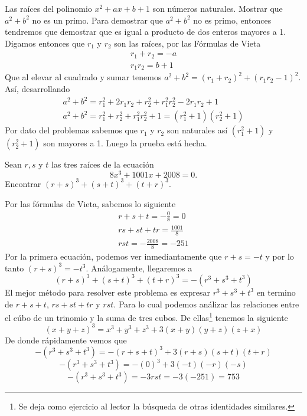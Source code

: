 {    \begin{example}[1986 URSS]
        Las raíces del polinomio $x^2 + ax + b + 1$ son números naturales. Mostrar que $a^2 + b^2$ no es un primo.
        \solution
        {
            Para demostrar que $a^2 + b^2$ no es primo, entonces tendremos que demostrar que es igual a producto de dos enteros mayores a 1.
            Digamos entonces que $r_1$ y $r_2$ son las raíces, por las Fórmulas de Vieta
            \begin{gather*}
                r_1 + r_2 = -a\\
                r_1 r_2 = b + 1
            \end{gather*}
            Que al elevar al cuadrado y sumar tenemos $a^2 + b^2 = (r_1 + r_2)^2 + (r_1 r_2 - 1)^2$. Así, desarrollando
            \begin{gather*}
                a^2 + b^2 = r^2_1 + 2r_1 r_2 + r^2_2 + r^2_1 r^2_2 - 2r_1 r_2 + 1 \\
                a^2 + b^2 = r^2_1 + r^2_2 + r^2_1 r^2_2+ 1 = \boxed{(r^2_1 + 1)(r^2_2 + 1)}
            \end{gather*}
            Por dato del problemas sabemos que $r_1$ y $r_2$ son naturales así $(r^2_1 + 1)$ y $(r^2_2 + 1)$ son mayores a 1.
            Luego la prueba está hecha.
        }
    \end{example}

    \begin{example}[2008 AIME II #7]
        Sean $r, s$ y $t$ las tres raíces de la ecuación
        \[8x^3 + 1001x + 2008 = 0.\]
        Encontrar $(r + s)^3 + (s + t)^3 + (t + r)^3.$

        \solution
        {
            Por las fórmulas de Vieta, sabemos lo siguiente
            \begin{gather*}
                r +  s + t = - \frac{0}{8} = 0 \\
                rs +  st + tr = \frac{1001}{8} \\
                r s t = - \frac{2008}{8} = -251
            \end{gather*}
            Por la primera ecuación, podemos ver inmediantamente que $r + s = -t$ y por lo tanto $(r + s)^3 = - t^3$.
            Análogamente, llegaremos a
            \[(r + s)^3 + (s + t)^3 + (t + r)^3 =  -(r^3 + s^3 + t^3)\]
            El mejor método para resolver este problema es expresar $r^3 + s^3 + t^3$ en termino de $r +  s + t$, $rs +  st + tr$ y $r s t$.
            Para lo cual podemos análizar las relaciones entre el cúbo de un trinomio y la suma de tres cubos.
            De ellas\footnote{Se deja como ejercicio al lector la búsqueda de otras identidades similares.} tenemos la siguiente
            \[(x + y + z)^3 = x^3 + y^3 + z^3 + 3(x + y)(y + z)(z + x)\]
            De donde rápidamente vemos que
            \[-(r^3 + s^3 + t^3) = - (r + s + t)^3 + 3(r + s)(s + t)(t + r)\]
            \[-(r^3 + s^3 + t^3) = -(0)^3 + 3(-t)(-r)(-s)\]
            \[-(r^3 + s^3 + t^3) = - 3rst = -3(-251) = \boxed{753}\]
        }
    \end{example}

}\label{sec:desarrollo}

